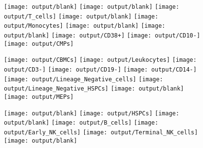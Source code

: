 \documentclass[11pt]{article}
\begin{document}
\begin{figure}[htbp]
\begin{minipage}[t]{0.125\textwidth}
  \end{minipage}%
  \begin{minipage}[t]{0.125\textwidth}
    \centering
    \vspace{-0.333\linewidth} %
    \texttt{[image: output/blank]}
    \texttt{[image: output/blank]}
    \texttt{[image: output/T\_cells]}
    \texttt{[image: output/blank]}
    \texttt{[image: output/Monocytes]}
    \texttt{[image: output/blank]}
    \texttt{[image: output/blank]}
    \texttt{[image: output/CD38+]}
    \texttt{[image: output/CD10-]}
    \texttt{[image: output/CMPs]}
  \end{minipage}%
  \begin{minipage}[t]{0.125\textwidth}
    \centering
    \texttt{[image: output/CBMCs]}
    \texttt{[image: output/Leukocytes]}
    \texttt{[image: output/CD3-]}
    \texttt{[image: output/CD19-]}
    \texttt{[image: output/CD14-]}
    \texttt{[image: output/Lineage\_Negative\_cells]}
    \texttt{[image: output/Lineage\_Negative\_HSPCs]}
    \texttt{[image: output/blank]}
    \texttt{[image: output/MEPs]}
  \end{minipage}%
  \begin{minipage}[t]{0.125\textwidth}
    \centering
    \vspace{-0.333\linewidth} %
    \texttt{[image: output/blank]}
    \texttt{[image: output/HSPCs]}
    \texttt{[image: output/blank]}
    \texttt{[image: output/B\_cells]}
    \texttt{[image: output/Early\_NK\_cells]}
    \texttt{[image: output/Terminal\_NK\_cells]}
    \texttt{[image: output/blank]}

\end{minipage}
\end{figure}
\end{document}
